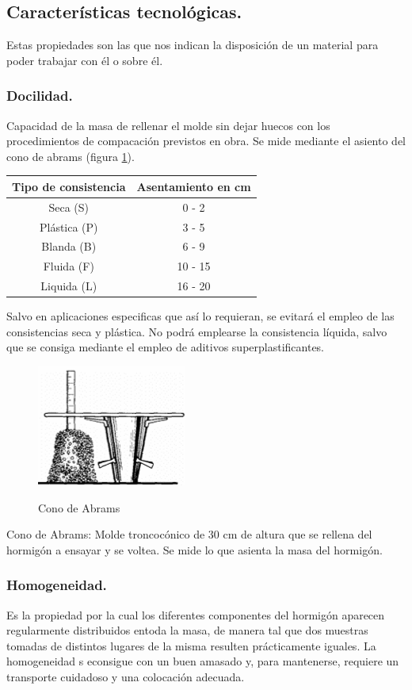 \subsection{Características tecnológicas.}
Estas propiedades son las que nos indican la disposición de un material para poder trabajar con él o sobre él.

\subsubsection{Docilidad.}
Capacidad de la masa de rellenar el molde sin dejar huecos con los procedimientos de compacación previstos en obra. Se mide mediante el asiento del cono de abrams (figura \ref{fig: Cono de Abrams}).
\begin{table}[H]
    \centering
    \begin{tabular}{c c}
        Tipo de consistencia & Asentamiento en cm \\
        \hline
        Seca (S) & 0 - 2 \\
        Plástica (P) & 3 - 5 \\
        Blanda (B) & 6 - 9 \\
        Fluida (F) & 10 - 15 \\
        Liquida (L) & 16 - 20 \\
    \end{tabular}
\end{table}
Salvo en aplicaciones especificas que así lo requieran, se evitará el empleo de las consistencias seca y plástica. No podrá emplearse la consistencia líquida, salvo que se consiga mediante el empleo de aditivos superplastificantes.

\begin{figure}[H]
    \centering
    \includegraphics[width = 0.25 \textwidth]{Imagenes/Cono de Abrams.png}
    \label{fig: Cono de Abrams}
    \caption{Cono de Abrams}
\end{figure}

Cono de Abrams: Molde troncocónico de 30 cm de altura que se rellena del hormigón a ensayar y se voltea. Se mide lo que asienta la masa del hormigón.

\subsubsection{Homogeneidad.}
Es la propiedad por la cual los diferentes componentes del hormigón aparecen regularmente distribuidos entoda la masa, de manera tal que dos muestras tomadas de distintos lugares de la misma resulten prácticamente iguales. La homogeneidad s econsigue con un buen amasado y, para mantenerse, requiere un transporte cuidadoso y una colocación adecuada.

